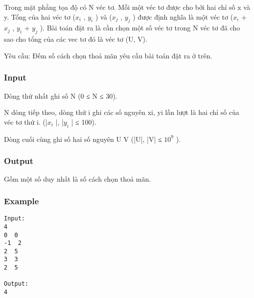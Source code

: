 



   Trong mặt phẳng tọa độ có N véc tơ. Mỗi một véc tơ được cho bởi hai chỉ số x và y. Tổng của hai véc tơ ($x_{i}$   , $y_{i}$   ) và ($x_{j}$   , $y_{j}$   ) được định nghĩa là một véc tơ ($x_{i}$   + $x_{j}$   , $y_{i}$   + $y_{j}$   ). Bài toán đặt ra là cần chọn một số véc tơ trong N véc tơ đã cho sao cho tổng của các vec tơ đó là véc tơ (U, V).  

   Yêu cầu: Đếm số cách chọn thoả mãn yêu cầu bài toán đặt ra ở trên.  

\subsubsection{   Input  }

   Dòng thứ nhất ghi số N (0 ≤ N ≤ 30).  

   N dòng tiếp theo, dòng thứ i ghi các số nguyên xi, yi lần lượt là hai chỉ số của véc tơ thứ i. (|$x_{i}$   |, |$y_{i}$   | ≤ 100).  

   Dòng cuối cùng ghi số hai số nguyên U V (|U|, |V| ≤ $10^{9}$   ).  

\subsubsection{   Output  }

   Gồm một số duy nhất là số cách chọn thoả mãn.  

\subsubsection{   Example  }
\begin{verbatim}
Input:
4
0  0
-1  2
2  5
3  3
2  5

Output:
4

\end{verbatim}
